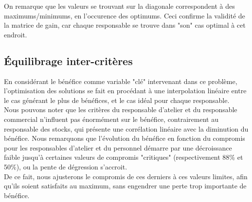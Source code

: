 \documentclass{article}
\begin{document}
On remarque que les valeurs se trouvant sur la diagonale correspondent à des
maximums/minimums, en l'occurence des optimums. Ceci confirme la validité de
la matrice de gain, car chaque responsable se trouve dans "son" cas optimal
à cet endroit.

\subsection{Équilibrage inter-critères}

En considérant le bénéfice comme variable "clé" intervenant dans ce problème,
l'optimisation des solutions se fait en procédant à une interpolation linéaire
entre le cas générant le plus de bénéfices, et le cas idéal pour chaque
responsable. \\


Nous pouvons noter que les critères du responsable d'atelier et du responsable
commercial n'influent pas énormément sur le bénéfice, contrairement au
responsable des stocks, qui présente une corrélation linéaire avec la
diminution du bénéfice.
Nous remarquons que l'évolution du bénéfice en fonction du compromis pour les
responsables d'atelier et du personnel démarre par une décroissance faible
jusqu'à certaines valeurs de compromis "critiques" (respectivement 88\% et
50\%), ou la pente de dégression s'accroit. \\

De ce fait, nous ajusterons le compromis de ces derniers à ces valeurs limites,
afin qu'ils soient satisfaits au maximum, sans engendrer une perte trop
importante de bénéfice. \\

\end{document}
